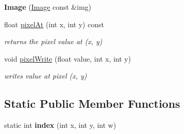 \begin{DoxyCompactItemize}
\item 
\hypertarget{class_image_a11c4da10d93cb19f684f5dbec08e564d}{{\bfseries Image} (\hyperlink{class_image}{Image} const \&img)}\label{class_image_a11c4da10d93cb19f684f5dbec08e564d}

\item 
\hypertarget{class_image_a9b183ad498d8ffea3f91a21e5a67920d}{float \hyperlink{class_image_a9b183ad498d8ffea3f91a21e5a67920d}{pixel\-At} (int x, int y) const }\label{class_image_a9b183ad498d8ffea3f91a21e5a67920d}

\begin{DoxyCompactList}\small\item\em returns the pixel value at (x, y) \end{DoxyCompactList}\item 
\hypertarget{class_image_afcd6f049060759d996f08b335ef2351d}{void \hyperlink{class_image_afcd6f049060759d996f08b335ef2351d}{pixel\-Write} (float value, int x, int y)}\label{class_image_afcd6f049060759d996f08b335ef2351d}

\begin{DoxyCompactList}\small\item\em writes value at pixel (x, y) \end{DoxyCompactList}\end{DoxyCompactItemize}
\subsection*{Static Public Member Functions}
\begin{DoxyCompactItemize}
\item 
\hypertarget{class_image_a990667d3006b26e839421d76cfb8d1d9}{static int {\bfseries index} (int x, int y, int w)}\label{class_image_a990667d3006b26e839421d76cfb8d1d9}

\end{DoxyCompactItemize}
